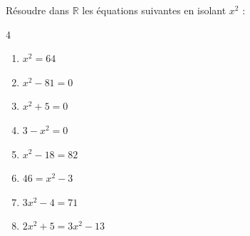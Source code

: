 \documentclass[main.tex]{subfiles}
\begin{document}
\begin{exercise} \label{chapter09:exercice:equationcarre} Résoudre dans $\mathbb{R}$ les équations suivantes en isolant $x^2$ : \hfill   
\vspace{-0.5em}
	\begin{multicols}{4}
		\begin{enumerate}[label={$(E_{\arabic*})$}, leftmargin=*] 
			\item   $x^2=64$
			\item  $x^2-81=0$
			\item   $x^2+5=0$
			\item  $3- x^2=0$
			\item  $x^2-18=82$
			\item  $46=x^2-3$
			\item $3x^2-4=71$
			\item $2x^2+5 =  3x^2 -13$
		\end{enumerate}
	\end{multicols}  
\vspace{-0.5em}	
\end{exercise} 
\end{document}
